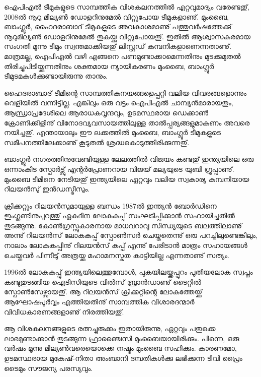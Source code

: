 \vskip 1pt

ഐപിഎല്‍ ടീമുകളുടെ സാമ്പത്തിക വിശകലനത്തില്‍ എറ്റവുമാദ്യം വരേണ്ടതു്, 2008ല്‍ നൂറു മില്യണ്‍ ഡോളറിനുമേല്‍ 
വിറ്റുപോയ ടീമുകളാണു്. മുംബൈ, ബാംഗ്ലൂര്‍, ഹൈദരാബാദ് ടീമുകളുടെ അവകാശമാണു് പത്തുവര്‍ഷത്തേക്കു് 
നൂറുമില്യണ്‍ ഡോളറിനുമേല്‍ തുകയ്ക്കു വിറ്റുപോയതു്. ഇതില്‍ ആശ്വാസകരമായ സംഗതി മൂന്നു ടീമും സ്വന്തമാക്കിയതു് 
ലിസ്റ്റഡ് കമ്പനികളാണെന്നതാണു്. മാത്രമല്ല, ഐപിഎല്‍ വഴി എങ്ങനെ പണമുണ്ടാക്കാമെന്നതിനും 
മുടക്കുമുതല്‍ തിരിച്ചുപിടിയ്ക്കുന്നതിനും ശക്തമായ ന്യായീകരണം മുംബൈ, ബാംഗ്ലൂര്‍ ടീമുടമകള്‍ക്കുണ്ടായിരുന്നു താനും. 

ഹൈദരാബാദ് ടീമിന്റെ സാമ്പത്തികനയങ്ങളെപ്പറ്റി വലിയ വിവരങ്ങളൊന്നും വെളിയില്‍ വന്നിട്ടില്ല. എങ്കിലും ഒരു വട്ടം 
ഐപിഎല്‍ ചാമ്പ്യന്‍മാരായതും, ആന്ധ്രാപ്രദേശിലെ ആരാധകവൃന്ദവും, ഉടമസ്ഥരായ ഡെക്കാണ്‍ ക്രോണിക്കിളിനു് 
വിനോദവ്യവസായത്തിലുള്ള താല്‍പ്പര്യങ്ങളുമാകണം അവരെ നയിച്ചതു്. എന്തായാലും ഈ ലക്കത്തില്‍ മുംബൈ, 
ബാംഗ്ലൂര്‍ ടീമുകളുടെ സമീപനത്തിലേക്കാണു് കൂടുതല്‍ ശ്രദ്ധകൊടുത്തിരിക്കുന്നതു്.

ബാംഗ്ലൂര്‍ നഗരത്തിനുവേണ്ടിയുള്ള ലേലത്തില്‍ വിജയം കണ്ടതു് ഇന്ത്യയിലെ ഒരു ഒന്നാംകിട സ്പോര്‍ട്സു് എന്റര്‍പ്രോണറായ 
വിജയ് മല്യയുടെ യുബി ഗ്രൂപ്പാണു്. മുംബൈ ടീമിനെ നേടിയതു് ഇന്ത്യയിലെ ഏറ്റവും വലിയ സ്വകാര്യ കമ്പനിയായ റിലയന്‍സു് 
ഇന്‍ഡസ്ട്രീസും.


ക്രിക്കറ്റും റിലയന്‍സുമായുള്ള ബന്ധം 1987ല്‍ ഇന്ത്യന്‍ ബോര്‍ഡിനെ ഇംഗ്ലണ്ടിനുപുറത്തു് ഏകദിന ലോകകപ്പ് 
സംഘടിപ്പിക്കാന്‍ സഹായിച്ചതില്‍ തുടങ്ങുന്നു. കോണ്‍ഗ്രസ്സുകാരനായ മാധവറാവു സിന്ധ്യയുടെ ബലത്തിലാണു് 
അന്നു് റിലയന്‍സ് ലോകകപ്പ് സ്പോണ്‍സര്‍ ചെയ്തതെന്നു് ഒരു പറച്ചിലുണ്ടെങ്കിലും, നാലാം ലോകകപ്പിനു് റിലയന്‍സ് 
കപ്പ് എന്നു് പേരിടാന്‍ മാത്രം സഹായങ്ങള്‍ ചെയ്തവര്‍ പിന്നീടു് അത്രയ്ക്കു മഹാമനസ്കത കാട്ടിയില്ല എന്നതാണു് സത്യം.

1996ല്‍ ലോകകപ്പു് ഇന്ത്യയിലെത്തുമ്പോള്‍, പുകയിലയ്ക്കപ്പുറം പുതിയലോക സ്വപ്നം കണ്ടുതുടങ്ങിയ ഐടിസിയുടെ 
വില്‍സ് ബ്രാന്‍ഡാണു് ടൈറ്റില്‍ സ്പോണ്‍സേഴ്സായതു്. ആ റിലയന്‍സ് ക്രിക്കറ്റിന്റെ ലോകത്തേയ്ക്കു് ആഘോഷപൂര്‍‌വ്വം 
എത്തിയതിനു് സാമ്പത്തിക വിശാരദന്മാര്‍ വിവിധകാരണങ്ങളാണു് നിരത്തിയതു്.

ആ വിശകലനങ്ങളുടെ രത്നച്ചുരുക്കം ഇതായിരുന്നു, ഏറ്റവും പതുക്കെ ലാഭമുണ്ടാക്കാന്‍ തുടങ്ങുന്ന ഫ്രാഞ്ചൈസി 
മുംബൈയായിരിക്കും. പിന്നെ, ഒരു വര്‍ഷം മൂന്നു മില്യണ്‍വരെയൊക്കെ നഷ്ടം മുംബൈ സഹിക്കും. കാരണമോ, 
ഉടമസ്ഥരായ മുകേഷ്-നിതാ അംബാനി ദമ്പതികള്‍ക്കു ലഭിക്കുന്ന ടിവി പ്രൈം ടൈമും സൗജന്യ പരസ്യവും.


